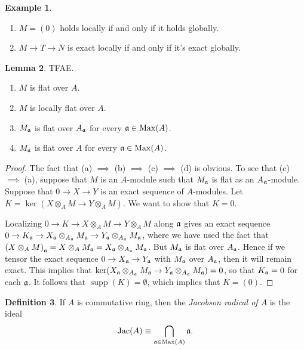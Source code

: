 \documentclass[10pt,letterpaper,cm]{nupset}
\theoremstyle{definition}
\newtheorem{definition}{Definition}[subsection]
\newtheorem{exmp}[definition]{Example}
\theoremstyle{theorem}
\newtheorem{lemma}[definition]{Lemma}
\theoremstyle{remark}
\newcommand{\1}{\mathbf{1}}
\newcommand{\0}{\vec 0}
\DeclareMathOperator{\Jac}{Jac}
\DeclareMathOperator{\Max}{Max}
\DeclareMathOperator{\supp}{supp}
\begin{document}
\begin{exmp} $ $
\begin{enumerate}
\item $M = \left(0\right)$ holds locally if and only if it holds globally. 
\item $M \to T \to N$ is exact locally if and only if it's exact globally. 
\end{enumerate}
\end{exmp}

\begin{lemma}  TFAE.
\begin{enumerate}[label=(\alph*)]
\item $M$ is flat over $A$.  
\item $M$ is locally flat over $A$. 
\item $M_{\frak{a}}$ is flat over $A_{\frak{a}}$ for every $\frak{a} \in \Max(A)$. 
\item $M_{\frak{a}}$ is flat over $A$ for every $\frak{a} \in \Max(A)$. 
\end{enumerate}
\end{lemma}
\begin{proof}
The fact that (a) $\implies$ (b) $\implies$ (c) $\implies$ (d) is obvious. To see that (c) $\implies$ (a), suppose that $M$ is an $A$-module such that $M_{\frak{a}}$ is flat  as an $A_{\frak{a}}$-module. 
Suppose that $0 \to X \to Y$ is an exact sequence of $A$-modules. Let $K = \ker( X \otimes_A M \to Y \otimes_A M)$. We want to show that $K=0$.   

Localizing $0 \to K \to X \otimes_A M \to Y \otimes_A M$ along $\frak{a}$ gives an exact sequence $0 \to K_{\frak{a}} \to X_{\frak{a}} \otimes_{A_{\frak{a}}} M_{\frak{a}} \to Y_{\frak{a}} \otimes_{A_{\frak{a}}} M_{\frak{a}}$, where we have used the fact that $\left(X \otimes_A M\right)_{\frak{a}} = X \otimes_A M_{\frak{a}} = X_{\frak{a}} \otimes_{A_{\frak{a}}} M_{\frak{a}}$. But $M_{\frak{a}}$ is flat over $A_{\frak{a}}$. Hence if we tensor the exact sequence $0 \to X_{\frak{a}} \to Y_{\frak{a}}$ with $M_{\frak{a}}$ over $A_{\frak{a}}$, then it will remain exact. This implies that $\ker(X_{\frak{a}} \otimes_{A_{\frak{a}}} M_{\frak{a}} \to Y_{\frak{a}} \otimes_{A_{\frak{a}}} M_{\frak{a}}) =0$, so that $K_{\frak{a}} = 0$ for each $\frak{a}$. It follows that $\supp(K) = \emptyset$, which implies that $K= \left(0\right)$. 
\end{proof}

\begin{definition}
If $A$ is commutative ring, then the \textit{Jacobson radical of $A$} is the ideal $$\Jac(A) \equiv \bigcap_{\frak{a} \in \Max(A)} \frak{a} .$$
\end{definition}
\end{document}
